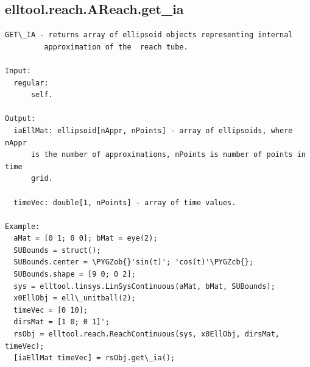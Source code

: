 \documentclass[letterpaper,10pt,english]{sphinxmanual}
\def\PYGZob{\char`\{}
\def\PYGZcb{\char`\}}
\begin{document}
\subsection{elltool.reach.AReach.get\_ia}
\label{chap_functions:elltool-reach-areach-get-ia}
\begin{Verbatim}[commandchars=\\\{\}]
GET\_IA - returns array of ellipsoid objects representing internal
         approximation of the  reach tube.

Input:
  regular:
      self.

Output:
  iaEllMat: ellipsoid[nAppr, nPoints] - array of ellipsoids, where nAppr
      is the number of approximations, nPoints is number of points in time
      grid.

  timeVec: double[1, nPoints] - array of time values.

Example:
  aMat = [0 1; 0 0]; bMat = eye(2);
  SUBounds = struct();
  SUBounds.center = \PYGZob{}'sin(t)'; 'cos(t)'\PYGZcb{};
  SUBounds.shape = [9 0; 0 2];
  sys = elltool.linsys.LinSysContinuous(aMat, bMat, SUBounds);
  x0EllObj = ell\_unitball(2);
  timeVec = [0 10];
  dirsMat = [1 0; 0 1]';
  rsObj = elltool.reach.ReachContinuous(sys, x0EllObj, dirsMat, timeVec);
  [iaEllMat timeVec] = rsObj.get\_ia();
\end{Verbatim}
\end{document}
